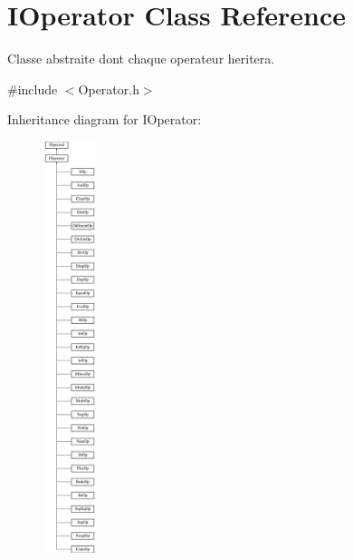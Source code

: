 \hypertarget{class_i_operator}{}\section{I\+Operator Class Reference}
\label{class_i_operator}


Classe abstraite dont chaque operateur heritera.  




{\ttfamily \#include $<$Operator.\+h$>$}

Inheritance diagram for I\+Operator\+:\begin{figure}[H]
\begin{center}
\leavevmode
\includegraphics[height=12.000000cm]{class_i_operator}
\end{center}
\end{figure}

